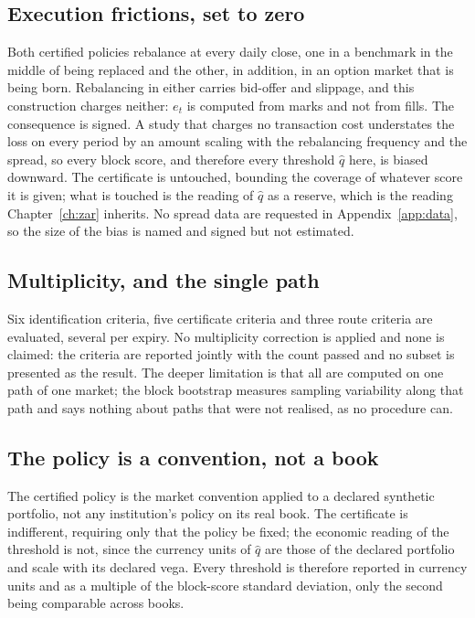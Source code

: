 \documentclass[../../../main.tex]{subfiles}
\begin{document}
\subsection{Execution frictions, set to zero}

Both certified policies rebalance at every daily close, one in a benchmark in the middle of being replaced and the other, in addition, in an option market that is being born. Rebalancing in either carries bid-offer and slippage, and this construction charges neither: $e_t$ is computed from marks and not from fills. The consequence is signed. A study that charges no transaction cost understates the loss on every period by an amount scaling with the rebalancing frequency and the spread, so every block score, and therefore every threshold $\hat q$ here, is biased downward. The certificate is untouched, bounding the coverage of whatever score it is given; what is touched is the reading of $\hat q$ as a reserve, which is the reading Chapter~\ref{ch:zar} inherits. No spread data are requested in Appendix~\ref{app:data}, so the size of the bias is named and signed but not estimated.

\subsection{Multiplicity, and the single path}

Six identification criteria, five certificate criteria and three route criteria are evaluated, several per expiry. No multiplicity correction is applied and none is claimed: the criteria are reported jointly with the count passed and no subset is presented as the result. The deeper limitation is that all are computed on one path of one market; the block bootstrap measures sampling variability along that path and says nothing about paths that were not realised, as no procedure can.

\subsection{The policy is a convention, not a book}

The certified policy is the market convention applied to a declared synthetic portfolio, not any institution's policy on its real book. The certificate is indifferent, requiring only that the policy be fixed; the economic reading of the threshold is not, since the currency units of $\hat q$ are those of the declared portfolio and scale with its declared vega. Every threshold is therefore reported in currency units and as a multiple of the block-score standard deviation, only the second being comparable across books.
\end{document}
